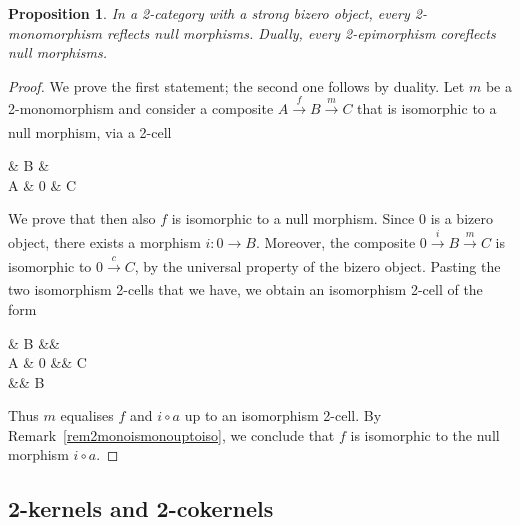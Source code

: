 \documentclass[reqno,a4paper]{amsart}
\numberwithin{equation}{section}
\theoremstyle{plain}
\newtheorem{proposition}[subsection]{Proposition}
\theoremstyle{definition}
\def\nameit#1{\textrm{#1}~}
\def\remx{\nameit{Remark}}
\newcommand{\comp}{\circ}
\renewcommand{\1}{\onecat{1}}
\newcommand{\aar}[2][]{\xrightarrow[#1]{#2}}
\begin{document}
\begin{proposition}\label{prop2monoreflectsnull}
	In a 2-category with a strong bizero object, every 2-monomorphism reflects null morphisms. Dually, every 2-epimorphism coreflects null morphisms.
\end{proposition}
\begin{proof}
	We prove the first statement; the second one follows by duality. Let \(m\) be a 2-monomorphism and consider a composite \(A\aar{f}B\aar{m}C\) that is isomorphic to a null morphism, via a 2-cell
	\begin{cd}[5]
		\& B \& \\
		A \& 0 \& C
		\arrow["m", from=1-2, to=2-3]
		\arrow["f", from=2-1, to=1-2]
		\arrow[from=2-1, to=2-2, "a"']
		\arrow["\delta"{inner sep = 1ex}, shift left=5, iso, from=2-1, to=2-3]
		\arrow[from=2-2, to=2-3, "c"']
	\end{cd}
	We prove that then also \(f\) is isomorphic to a null morphism. Since \(0\) is a bizero object, there exists a morphism \(i\colon 0\to B\). Moreover, the composite \(0\aar{i}B\aar{m}C\) is isomorphic to \(0\aar{c}C\), by the universal property of the bizero object. Pasting the two isomorphism 2-cells that we have, we obtain an isomorphism 2-cell of the form
	\begin{cd}[4]
		\& B \&\& \\
		A \& 0 \&\& C \\
		\&\& B
		\arrow["m", from=1-2, to=2-4]
		\arrow["f", from=2-1, to=1-2]
		\arrow["a"', from=2-1, to=2-2]
		\arrow["\delta"{inner sep=1ex}, shift left=3.5,iso, from=2-1, to=2-4]
		\arrow["c"', from=2-2, to=2-4]
		\arrow[shift right=6, iso, from=2-2, to=2-4]
		\arrow["i"', from=2-2, to=3-3]
		\arrow["m"', from=3-3, to=2-4]
	\end{cd}
	Thus \(m\) equalises \(f\) and \(i\comp a\) up to an isomorphism 2-cell. By \remx\ref{rem2monoismonouptoiso}, we conclude that \(f\) is isomorphic to the null morphism \(i\comp a\).
\end{proof}

\subsection{2-kernels and 2-cokernels}\label{SS:Kernels}
\end{document}
